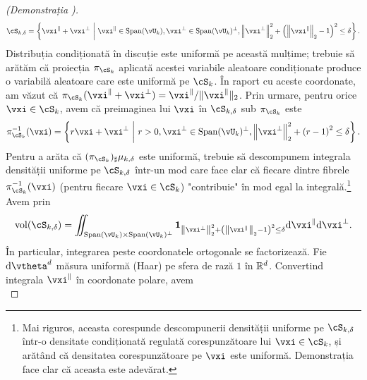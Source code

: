 \documentclass[../../book-main_ro.tex]{subfiles}
\begin{document}
\begin{proof}[(Demonstrația )]
\begin{equation}
        \cS_{k, \delta} = \set*{
            \vxi^{\|} + \vxi^{\perp} 
            \given 
            \vxi^{\|} \in \Span(\vU_k),
            \vxi^{\perp} \in \Span(\vU_k)^\perp,
            \norm*{\vxi^{\perp}}_2^2
            + \left( \norm*{\vxi^{\|}}_2 - 1 \right)^2
            \leq
            \delta
        }.
    \end{equation}
    Distribuția condiționată în discuție este uniformă pe această mulțime; trebuie să
    arătăm că proiecția $\pi_{\cS_k}$ aplicată acestei variabile aleatoare
    condiționate produce o variabilă aleatoare care este uniformă pe $\cS_k$.
    În raport cu aceste coordonate, am văzut că $\pi_{\cS_k}(\vxi^\|
    + \vxi^\perp) = \vxi^\| / \norm{\vxi^{\|}}_2$.
    Prin urmare, pentru orice $\vxi \in \cS_{k}$, avem că preimaginea lui $\vxi$ în
    $\cS_{k, \delta}$ sub $\pi_{\cS_k}$ este
    \begin{equation}
        \pi_{\cS_k}^{-1}(\vxi) = \set*{
            r\vxi + \vxi^\perp 
            \given
            r > 0,
            \vxi^{\perp} \in \Span(\vU_k)^\perp,
            \norm*{\vxi^{\perp}}_2^2
            + \left( r - 1 \right)^2
            \leq
            \delta
        }.
        \label{eq:fiber-of-uos}
    \end{equation}
    Pentru a arăta că $(\pi_{\cS_k})_{\sharp} \mu_{k, \delta}$ este uniformă, trebuie să
    descompunem integrala densității uniforme pe $\cS_{k, \delta}$ într-un mod
    care face clar că fiecare dintre fibrele
    $\pi_{\cS_k}^{-1}(\vxi)$ (pentru fiecare $\vxi \in \cS_k$) "contribuie" în mod egal
    la integrală.\footnote{Mai riguros, aceasta corespunde descompunerii
    densității uniforme pe $\cS_{k, \delta}$ într-o densitate condiționată regulată
    corespunzătoare lui $\vxi \in \cS_{k}$, și arătând că densitatea
    corespunzătoare pe $\vxi$ este uniformă. Demonstrația face clar că aceasta este adevărat.}
    Avem prin 
    \begin{equation}
        \volume(\cS_{k, \delta})
        = \iint_{\Span(\vU_k) \times \Span(\vU_k)^\perp} \mathbf{1}_{
            \norm*{\vxi^{\perp}}_2^2
            + \left( \norm*{\vxi^{\|}}_2 - 1 \right)^2
            \leq
            \delta
        }
        \odif \vxi^{\|} \odif \vxi^{\perp}.
    \end{equation}
    În particular, integrarea peste coordonatele ortogonale se factorizează.
    Fie $\odif \vtheta^{d}$ măsura uniformă (Haar) pe sfera de
    rază $1$ în $\mathbb{R}^d$. Convertind integrala $\vxi^{\|}$ în coordonate
    polare, avem
    \begin{equation}

\end{equation}
\end{proof}
\end{document}
